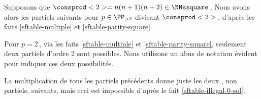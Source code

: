 Supposons que $\consprod<2> = n(n+1)(n+2) \in \NNssquare$\,. Nous avons alors les \sftab[x] partiels suivants pour $p \in \PP_{>2}$ divisant $\consprod<2>$\,, d'après les faits \ref{sftable-multiple} et \ref{sftable-parity-square}.

\begin{center}
\end{center}


Pour $p = 2$\,, via les faits \ref{sftable-multiple} et \ref{sftable-parity-square}, seulement deux \sftab[x] partiels d'ordre $2$ sont possibles. Nous utilisons un abus de notation évident pour indiquer ces deux possibilités.

\begin{center}
\end{center}


La multiplication de tous les \sftab[x] partiels précédents donne juste les deux \sftab[x], non partiels, suivants, mais ceci est impossible d'après le fait \ref{sftable-illegal-0-sol}.

\begin{center}
\end{center}
